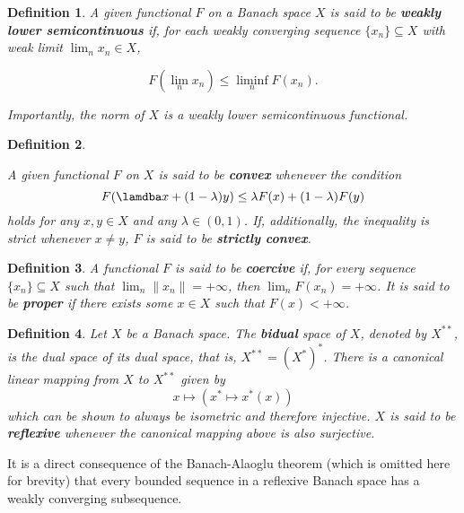 \documentclass[twocolumn,twoside,a4paper,10pt]{IEEEtran}
\newtheorem{definition}{Definition}
\begin{document}
\begin{definition}
  A given functional \(F\) on a Banach space \(X\) is said to be \textbf{weakly lower semicontinuous} if, for each weakly converging sequence \(\{x_n\}\subseteq X\) with weak limit \(\lim_nx_n\in X\),

  \[
    F(\lim_nx_n)\leq \liminf_n F(x_n)
  .\]

  Importantly, the norm of \(X\) is a weakly lower semicontinuous functional.
\end{definition}

\begin{definition}\label{def:convexity}

  A given functional \(F\) on \(X\) is said to be \textbf{convex} whenever the condition
  \[
    F(\lamdba x + (1-\lambda)y) \leq \lambda F(x) + (1-\lambda) F(y)
  \]
  holds for any \(x, y\in X\) and any \(\lambda\in(0, 1)\). If, additionally, the inequality is strict whenever \(x\neq y\), \(F\) is said to be \textbf{strictly convex}.
\end{definition}

\begin{definition}
  A functional \(F\) is said to be \textbf{coercive} if, for every sequence \(\{x_n\}\subseteq X\) such that \(\lim_n \|x_n\|=+\infty\), then \(\lim_nF(x_n)=+\infty\).
It is said to be \textbf{proper} if there exists some \(x\in X\) such that \(F(x) < +\infty\).
\end{definition}

\begin{definition}
  Let \(X\) be a Banach space. The \textbf{bidual} space of \(X\), denoted by \(X^{**}\), is the dual space of its dual space, that is, \(X^{**}=(X^*)^*\). There is a canonical linear mapping from \(X\) to \(X^{**}\) given by
  \[
    x\mapsto(x^*\mapsto x^*(x))
  \]
  which can be shown to always be isometric and therefore injective. \(X\) is said to be \textbf{reflexive} whenever the canonical mapping above is also surjective.
\end{definition}

It is a direct consequence of the Banach-Alaoglu theorem (which is omitted here for brevity) that every bounded sequence in a reflexive Banach space has a weakly converging subsequence.
\end{document}
